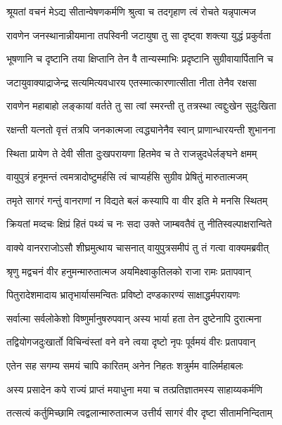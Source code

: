 \twolineshloka
{श्रूयतां वचनं मेऽद्य सीतान्वेषणकर्मणि}
{श्रुत्वा च तदगृहाण त्वं रोचते यन्नृपात्मज} %

\twolineshloka
{रावणेन जनस्थानान्नीयमाना तपस्विनी}
{जटायुषा तु सा दृष्ट्वा शक्त्या युद्धं प्रकुर्वता} %

\twolineshloka
{भूषणानि च दृष्टानि तया क्षिप्तानि तेन वै}
{तान्यस्माभिः प्रदृष्टानि सुग्रीवायार्पितानि च} %

\twolineshloka
{जटायुवाक्याद्राजेन्द्र सत्यमित्यवधारय}
{एतस्मात्कारणात्सीता नीता तेनैव रक्षसा} %

\twolineshloka
{रावणेन महाबाहो लङ्कायां वर्तते तु सा}
{त्वां स्मरन्ती तु तत्रस्था त्वद्दुःखेन सुदुःखिता} %

\twolineshloka
{रक्षन्ती यत्नतो वृत्तं तत्रपि जनकात्मजा}
{त्वद्ध्यानेनैव स्वान् प्राणान्धारयन्ती शुभानना} %

\twolineshloka
{स्थिता प्रायेण ते देवी सीता दुःखपरायणा}
{हितमेव च ते राजन्नुदधेर्लङ्घने क्षमम्} %

\twolineshloka
{वायुपुत्रं हनूमन्तं त्वमत्रादोष्टुमर्हसि}
{त्वं चाप्यर्हसि सुग्रीव प्रेषितुं मारुतात्मजम्} %

\twolineshloka
{तमृते सागरं गन्तुं वानराणां न विद्यते}
{बलं कस्यापि वा वीर इति मे मनसि स्थितम्} %

\twolineshloka
{क्रियतां मव्दचः क्षिप्रं हितं पथ्यं च नः सदा}
{उक्ते जाम्बवतैवं तु नीतिस्वल्पाक्षरान्विते} %

\twolineshloka
{वाक्ये वानरराजोऽसौ शीघ्रमुत्थाय चासनात्}
{वायुपुत्रसमीपं तु तं गत्वा वाक्यमब्रवीत्} %

\twolineshloka
{श्रृणु मद्वचनं वीर हनुमन्मारुतात्मज}
{अयमिक्ष्वाकुतिलको राजा रामः प्रतापवान्} %

\twolineshloka
{पितुरादेशमादाय भ्रातृभार्यासमन्वितः}
{प्रविष्टो दण्डकारण्यं साक्षाद्धर्मपरायणः} %

\twolineshloka
{सर्वात्मा सर्वलोकेशो विष्णुर्मानुषरुपवान्}
{अस्य भार्या हता तेन दुष्टेनापि दुरात्मना} %

\twolineshloka
{तद्वियोगजदुःखार्तो विचिन्वंस्तां वने वने}
{त्वया दृष्टो नृपः पूर्वमयं वीरः प्रतापवान्} %

\twolineshloka
{एतेन सह सगम्य समयं चापि कारितम्}
{अनेन निहतः शत्रुर्मम वालिर्महाबलः} %

\twolineshloka
{अस्य प्रसादेन कपे राज्यं प्राप्तं मयाधुना}
{मया च तत्प्रतिज्ञातमस्य साहाय्यकर्मणि} %

\twolineshloka
{तत्सत्यं कर्तुमिच्छामि त्वद्वलान्मारुतात्मज}
{उत्तीर्य सागरं वीर दृष्टा सीतामनिन्दिताम्} %

